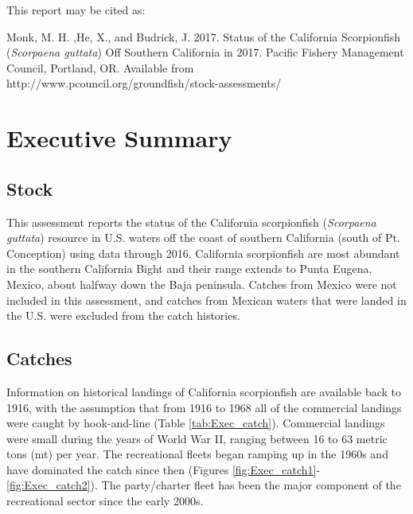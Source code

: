\documentclass[12pt,]{article}
\begin{document}
\begin{center}
\newpage

\begin{flushleft}
This report may be cited as:

Monk, M. H. ,He, X., and Budrick, J. 2017. Status of the California Scorpionfish (\emph{Scorpaena guttata}) Off Southern California in 2017. Pacific Fishery Management Council, Portland, OR. Available from http://www.pcouncil.org/groundfish/stock-assessments/
\end{flushleft}

\maketitle

\setcounter{page}{1}
\end{center}

{
\setcounter{tocdepth}{4}
\tableofcontents
}
\setlength{\parskip}{5mm plus1mm minus1mm} \pagebreak

\setcounter{page}{1} \renewcommand{\thefigure}{\alph{figure}}
\renewcommand{\thetable}{\alph{table}}

\section*{Executive Summary}\label{executive-summary}

\subsection*{Stock}\label{stock}

This assessment reports the status of the California scorpionfish
(\emph{Scorpaena guttata}) resource in U.S. waters off the coast of
southern California (south of Pt. Conception) using data through 2016.
California scorpionfish are most abundant in the southern California
Bight and their range extends to Punta Eugena, Mexico, about halfway
down the Baja peninsula. Catches from Mexico were not included in this
assessment, and catches from Mexican waters that were landed in the U.S.
were excluded from the catch histories.

\subsection*{Catches}\label{catches}

Information on historical landings of California scorpionfish are
available back to 1916, with the assumption that from 1916 to 1968 all
of the commercial landings were caught by hook-and-line (Table
\ref{tab:Exec_catch}). Commercial landings were small during the years
of World War II, ranging between 16 to 63 metric tons (mt) per year. The
recreational fleets began ramping up in the 1960s and have dominated the
catch since then (Figures \ref{fig:Exec_catch1}-\ref{fig:Exec_catch2}).
The party/charter fleet has been the major component of the recreational
sector since the early 2000s.
\end{document}
